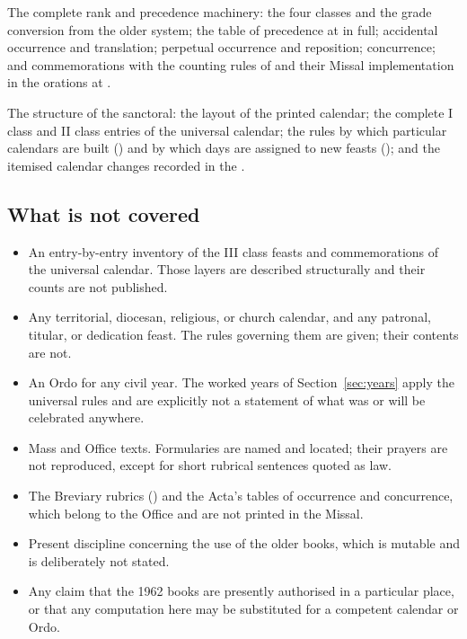 The complete rank and precedence machinery: the four classes and the grade conversion from the
older system; the table of precedence at  in full; accidental occurrence and translation;
perpetual occurrence and reposition; concurrence; and commemorations with the counting rules of
 and their Missal implementation in the orations at .

The structure of the sanctoral: the layout of the printed calendar; the complete I class and
II class entries of the universal calendar; the rules by which particular calendars are built
() and by which days are assigned to new feasts (); and the itemised
calendar changes recorded in the .

\subsection{What is not covered}

\begin{itemize}[leftmargin=1.3em, itemsep=0.2em]
\item An entry-by-entry inventory of the III class feasts and commemorations of the universal
calendar. Those layers are described structurally and their counts are not published.
\item Any territorial, diocesan, religious, or church calendar, and any patronal, titular, or
dedication feast. The rules governing them are given; their contents are not.
\item An Ordo for any civil year. The worked years of Section~\ref{sec:years} apply the
universal rules and are explicitly not a statement of what was or will be celebrated anywhere.
\item Mass and Office texts. Formularies are named and located; their prayers are not
reproduced, except for short rubrical sentences quoted as law.
\item The Breviary rubrics () and the Acta's tables of occurrence and concurrence,
which belong to the Office and are not printed in the Missal.
\item Present discipline concerning the use of the older books, which is mutable and is
deliberately not stated.
\item Any claim that the 1962 books are presently authorised in a particular place, or that any
computation here may be substituted for a competent calendar or Ordo.
\end{itemize}

